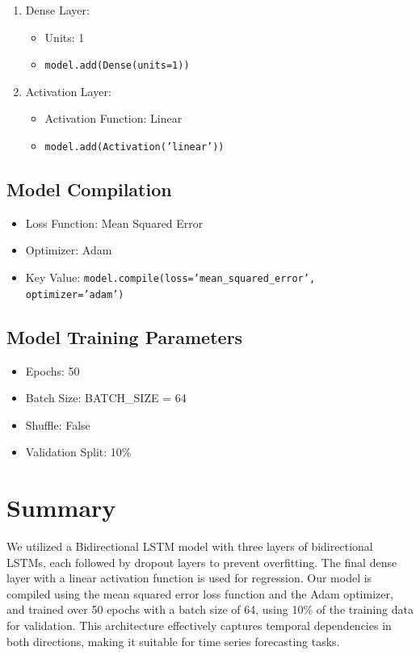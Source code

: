 \begin{enumerate}
    \item {Dense Layer}:
    \begin{itemize}
        \item Units: 1
        \item \texttt{model.add(Dense(units=1))}
    \end{itemize}

    \item {Activation Layer}:
    \begin{itemize}
        \item Activation Function: Linear
        \item \texttt{model.add(Activation('linear'))}
    \end{itemize}
\end{enumerate}

\subsection{Model Compilation}

\begin{itemize}
    \item Loss Function: Mean Squared Error
    \item Optimizer: Adam
    \item Key Value: \texttt{model.compile(loss='mean\_squared\_error', optimizer='adam')}
\end{itemize}

\subsection{Model Training Parameters}

\begin{itemize}
    \item Epochs: 50
    \item Batch Size: BATCH\_SIZE = 64
    \item Shuffle: False
    \item Validation Split: 10\%
\end{itemize}

\section*{Summary}

We utilized a Bidirectional LSTM model with three layers of bidirectional LSTMs, each followed by dropout layers to prevent overfitting. The final dense layer with a linear activation function is used for regression. Our model is compiled using the mean squared error loss function and the Adam optimizer, and trained over 50 epochs with a batch size of 64, using 10\% of the training data for validation. This architecture effectively captures temporal dependencies in both directions, making it suitable for time series forecasting tasks.
